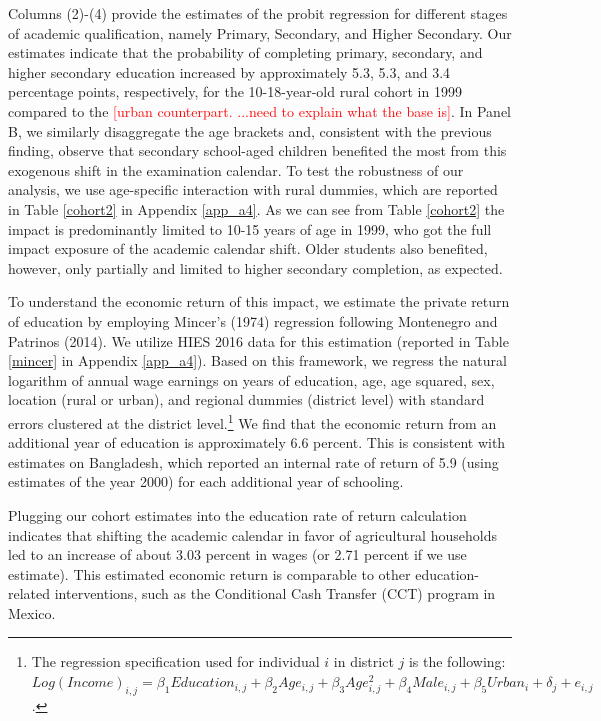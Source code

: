 \documentclass[12pt,letterpaper]{article}
\newcommand{\SAdded}[1]{\textcolor{red}{#1}}
\newcommand{\0}{\ensuremath{\mbox{\boldmath $0$}}}
\begin{document}
Columns (2)-(4) provide the estimates of the probit regression for different stages of academic qualification, namely Primary, Secondary, and Higher Secondary. Our estimates indicate that the probability of completing primary, secondary, and higher secondary education increased by approximately 5.3, 5.3, and 3.4 percentage points, respectively, for the 10-18-year-old rural cohort in 1999 compared to the \SAdded{[urban counterpart. ...need to explain what the base is]}. In Panel B, we similarly disaggregate the age brackets and, consistent with the previous finding, observe that secondary school-aged children benefited the most from this exogenous shift in the examination calendar. To test the robustness of our analysis, we use age-specific interaction with rural dummies, which are reported in Table \ref{cohort2} in Appendix \ref{app_a4}. As we can see from Table \ref{cohort2} the impact is predominantly limited to 10-15 years of age in 1999, who got the full impact exposure of the academic calendar shift. Older students also benefited, however, only partially and limited to higher secondary completion, as expected. 

To understand the economic return of this impact, we estimate the private return of education by employing Mincer's (1974) regression following Montenegro and Patrinos (2014). We utilize HIES 2016 data for this estimation (reported in Table \ref{mincer} in Appendix \ref{app_a4}). Based on this framework, we regress the natural logarithm of annual wage earnings on years of education, age, age squared, sex, location (rural or urban), and regional dummies (district level) with standard errors clustered at the district level.\footnote{The regression specification used for individual $i$ in district $j$ is the following: $Log(Income)_{i,j}=\beta_{1}Education_{i,j}+\beta_{2}Age_{i,j}+\beta_{3}Age^{2}_{i,j}+\beta_{4}Male_{i,j}+\beta_{5}Urban_{i}+\delta_{j}+e_{i,j}$.}
We find that the economic return from an additional year of education is approximately 6.6 percent. This is consistent with \cite{montenegro2014comparable} estimates on Bangladesh, which reported an internal rate of return of 5.9 (using estimates of the year 2000) for each additional year of schooling. 

Plugging our cohort estimates into the education rate of return calculation indicates that shifting the academic calendar in favor of agricultural households led to an increase of about 3.03 percent in wages (or 2.71 percent if we use \cite{montenegro2014comparable} estimate). This estimated economic return is comparable to other education-related interventions, such as the Conditional Cash Transfer (CCT) program in Mexico.
\end{document}
